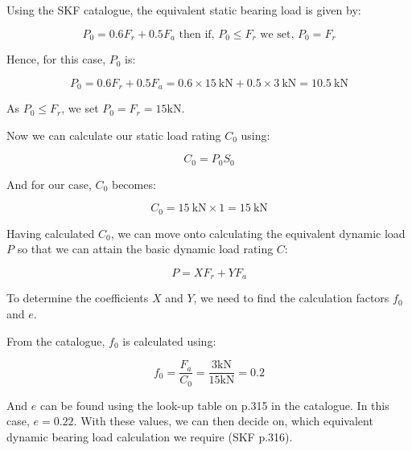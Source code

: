  Using the SKF catalogue, the equivalent static bearing load is given by:

\begin{equation}
    P_0 = 0.6F_r+0.5F_a \text{ then if, } P_0 \le F_r \text{ we set, }P_0 = F_r
\end{equation}

\noindent{} Hence, for this case, \(P_0\) is:

\begin{equation}
    P_0=0.6F_r+0.5F_a = 0.6\times\SI{15}{\kilo\newton} + 0.5\times\SI{3}{\kilo\newton} = \SI{10.5}{\kilo\newton}
\end{equation}

\noindent{} As \(P_0 \le F_r \), we set \(P_0 = F_r = 15\si{\kilo\newton} \).

Now we can calculate our static load rating \(C_0\) using:

\begin{equation}
    C_0=P_0S_0
\end{equation}

\noindent{} And for our case, \(C_0\) becomes:

\begin{equation}
    C_0= \SI{15}{\kilo\newton} \times 1 = \SI{15}{\kilo\newton}
\end{equation}


Having calculated \(C_0\), we can move onto calculating the equivalent dynamic load \(P\) so that we can attain the basic dynamic load rating \(C\):

\begin{equation}
    P = XF_r + YF_a
\end{equation}

To determine the coefficients \(X\) and \(Y\), we need to find the calculation factors \(f_0\) and \(e\).

From the catalogue, \(f_0\) is calculated using:

\begin{equation}
    f_0 = \frac{F_a}{C_0} = \frac{3\si{\kilo\newton}}{15\si{\kilo\newton}} = 0.2
\end{equation}

And \(e\) can be found using the look-up table on p.315 in the catalogue. In this case, \(e=0.22\). With these values, we can then decide on, which equivalent dynamic bearing load calculation we require (SKF p.316). 

